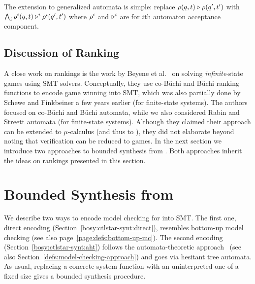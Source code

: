 The extension to generalized automata is simple:
replace
$\rho(q,t) \triangleright \rho(q',t')$ with
$\bigwedge_i \rho^i(q,t) \triangleright^i \rho^i(q',t')$
where $\rho^i$ and $\triangleright^i$ are for $i$th automaton acceptance component.



\subsection{Discussion of Ranking}


A close work on rankings is the work by Beyene et al.~\cite{RybHornSynth}
on solving \emph{infinite}-state games using SMT solvers.
Conceptually,
they use co-B\"uchi and B\"uchi ranking functions to encode game winning into SMT,
which was also partially done by Schewe and Finkbeiner \cite{BS} a few years earlier
(for finite-state systems).
The authors focused on co-B\"uchi and B\"uchi automata,
while we also considered Rabin and Streett automata
(for finite-state systems).
Although they claimed their approach can be extended to $\mu$-calculus
(and thus to \CTLstar),
they did not elaborate beyond noting that \CTLstar verification can be reduced to games.
In the next section we introduce two approaches to bounded synthesis from \CTLstar.
Both approaches inherit the ideas on rankings presented in this section.


\section{Bounded Synthesis from \CTLstar} \label{bosy:ctlstar-synt}

We describe two ways to encode model checking for \CTLstar into SMT.
The first one, direct encoding (Section~\ref{bosy:ctlstar-synt:direct}),
resembles bottom-up \CTLstar model checking \cite{DBLP:journals/toplas/ClarkeES86} (see also page~\ref{page:defs:bottom-up-mc}).
The second encoding (Section~\ref{bosy:ctlstar-synt:aht})
follows the automata-theoretic approach~\cite{ATA}
(see also Section~\ref{defs:model-checking-approach})
and goes via hesitant tree automata.
As usual,
replacing a concrete system function with an uninterpreted one of a fixed size gives a
bounded synthesis procedure.

